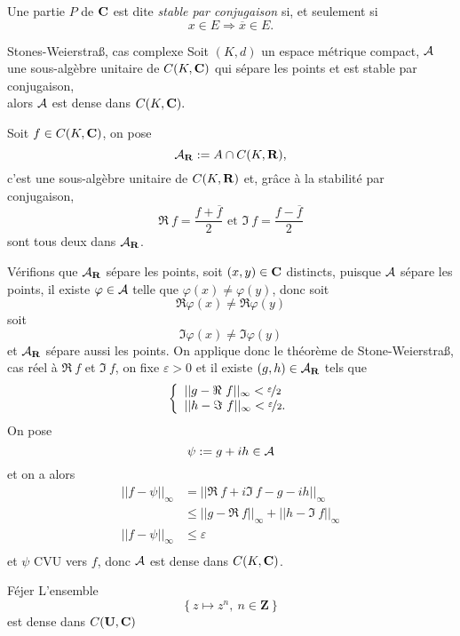 \documentclass[a4paper,11pt, twoside]{article}
\begin{document}
\begin{Def}
  Une partie $P$ de $\mathbf C$ est dite \emph{stable par conjugaison} si, et seulement si
  $$ x\in E\Rightarrow \overline x\in E.$$
\end{Def}

\begin{thC}{Stones-Weierstra\ss, cas complexe}
  Soit $(K,d)$ un espace métrique compact, $\mathcal A$ une sous-algèbre unitaire de $C(K,\mathbf C)$ qui sépare les points et est stable par conjugaison,\\

  alors $\mathcal A$ est dense dans $C(K,\mathbf C).$
\end{thC}

\begin{Proof}
  Soit $f\in C(K,\mathbf C)$, on pose 
  $$\mathcal A_{\mathbf R}:=A\cap C(K,\mathbf R),$$
  c'est une sous-algèbre unitaire de $C(K,\mathbf R)$ et, grâce à la stabilité par conjugaison, 
  $$\Re\ f=\frac{f+\overline f}2\text{ et }\Im\ f=\frac{f-\overline f}2$$
  sont tous deux dans $\mathcal A_{\mathbf R}$.

  Vérifions que $\mathcal A_{\mathbf R}$ sépare les points, soit $(x,y)\in \mathbf C$ distincts, puisque $\mathcal A$ sépare les points, il existe $\varphi\in \mathcal A$ telle que $\varphi(x)\neq \varphi(y)$, donc soit
  $$\Re \varphi(x)\neq \Re \varphi(y)$$
  soit 
  $$\Im \varphi(x)\neq \Im \varphi(y)$$
  et $\mathcal A_{\mathbf R}$ sépare aussi les points.
  On applique donc le théorème de Stone-Weierstra\ss, cas réel à $\Re\ f$ et $\Im\ f$, on fixe $\varepsilon>0$ et il existe $(g,h)\in \mathcal A_{\mathbf R}$ tels que 
  $$\left\{\begin{array}{l}
    ||g-\Re\ f||_{\infty}<\nicefrac{\varepsilon}{2}\\
    ||h-\Im\ f||_{\infty}<\nicefrac{\varepsilon}{2}.
  \end{array}\right.$$
  On pose $$\psi:=g+ih\in \mathcal A$$
  et on a alors
  \begin{align*}
    ||f-\psi||_{\infty}&=||\Re\ f+i\Im\ f-g-ih||_{\infty}\\
    &\leqslant ||g-\Re\ f||_{\infty}+||h-\Im\ f||_{\infty}\\
    ||f-\psi||_{\infty}&\leqslant \varepsilon\\
  \end{align*}
  et $\psi$ CVU vers $f$, donc $\mathcal A$ est dense dans $C(K,\mathbf C)$.
\end{Proof}


\begin{corollaireC}{Féjer}
  L'ensemble
  $$\left\{z\longmapsto z ^n,\ n\in\mathbf Z\right\}$$
  est dense dans $C(\mathbf U,\mathbf C)$
\end{corollaireC}
\end{document}
